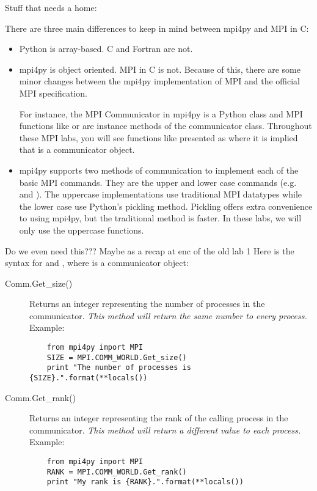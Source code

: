Stuff that needs a home:

    There are three main differences to keep in mind between mpi4py and MPI in C:
    \begin{itemize}
        \item Python is array-based. C and Fortran are not.
        \item mpi4py is object oriented. MPI in C is not.
            Because of this, there are some minor changes between the mpi4py implementation of
            MPI and the official MPI specification.

            For instance, the MPI Communicator in mpi4py is a Python class and MPI functions
            like  or  are instance methods of the communicator class.
            Throughout these MPI labs, you will see functions like  presented as
             where it is implied that  is a communicator object.
        \item mpi4py supports two methods of communication to implement each of the basic MPI commands.
            They are the upper and lower case commands (e.g.  and ).
            The uppercase implementations use traditional MPI datatypes while the lower case use
            Python's pickling method. Pickling offers extra convenience to using mpi4py,
            but the traditional method is faster. In these labs, we will only use the uppercase functions.
    \end{itemize}

Do we even need this??? Maybe as a recap at enc of the old lab 1
    Here is the syntax for  and , where  is a communicator object:
    \begin{description}
    \item[Comm.Get\_size()]
    Returns an integer representing the number of processes in the communicator.
    \emph{This method will return the same number to every process.}
    Example:
    \begin{lstlisting}
    from mpi4py import MPI
    SIZE = MPI.COMM_WORLD.Get_size()
    print "The number of processes is {SIZE}.".format(**locals())
    \end{lstlisting}
    \item[Comm.Get\_rank()]
    Returns an integer representing the rank of the calling process in the communicator.
    \emph{This method will return a different value to each process.}
    Example:
    \begin{lstlisting}
    from mpi4py import MPI
    RANK = MPI.COMM_WORLD.Get_rank()
    print "My rank is {RANK}.".format(**locals())
    \end{lstlisting}
    \end{description}

